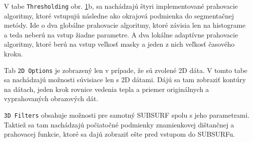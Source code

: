 \documentclass[a4paper,11pt,twoside]{article}%
\begin{document}
V tabe \texttt{Thresholding} obr. \ref{fig:uidata}b, sa nachádzajú štyri implementované prahovacie algoritmy, ktoré vstupujú  následne ako okrajová podmienka do segmentačnej metódy. Ide o dva globálne prahovacie algoritmy, ktoré závisia len na histograme a teda neberú na vstup žiadne parametre. A dva lokálne adaptívne prahovacie algoritmy, ktoré berú na vstup veľkosť masky a jeden z nich veľkosť časového kroku.


\begin{figure}[h!]%
    \centering
    \qquad
    \label{fig:uidata}%
\end{figure}

Tab \texttt{2D Options} je zobrazený len v prípade, že sú zvolené 2D dáta. V tomto tabe sa nachádzajú možnosti súvisiace len s 2D dátami. Dájú sa tam zobraziť kontúry na dátach,  jeden krok rovnice vedenia tepla a priemer originálnych a vyprahovaných obrazových dát. 

\texttt{3D Filters} obsahuje možnosti pre samotný SUBSURF spolu s jeho parametrami. Taktiež sa tam nachádzajú počiatočné podmienky znamienkovej dištančnej a prahovacej funkcie, ktoré sa dajú zobraziť ešte pred vstupom do SUBSURFu.
\end{document}
